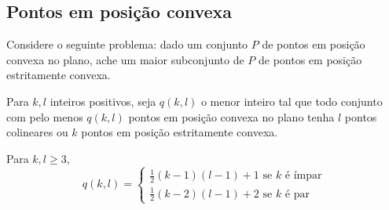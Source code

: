\subsection{Pontos em posição convexa}
Considere o seguinte problema: dado um conjunto $P$ de pontos em posição convexa no plano, ache um maior subconjunto de $P$ de pontos em posição estritamente convexa.

Para $k,l$ inteiros positivos, seja $q(k,l)$ o menor inteiro tal que todo conjunto com pelo menos $q(k,l)$ pontos em posição convexa no plano tenha $l$ pontos colineares ou $k$ pontos em posição estritamente convexa.

\begin{lema}\label{convex}
    Para $k,l\geq 3$, 
    $$q(k,l)=
    \begin{cases}
        \frac{1}{2}(k-1)(l-1)+1 \text{ se }k\text{ é ímpar}\\
        \frac{1}{2}(k-2)(l-1)+2  \text{ se }k\text{ é par}
    \end{cases}$$
\end{lema}
